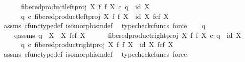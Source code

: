 \begin{isabellebody}
\ \ \ \ \ \ {\isachardoublequoteopen}fibered{\isacharunderscore}{\kern0pt}product{\isacharunderscore}{\kern0pt}left{\isacharunderscore}{\kern0pt}proj\ X\ f\ f\ X\ {\isasymcirc}\isactrlsub c\ q{}\ {\isacharequal}{\kern0pt}\ id\ X{\isachardoublequoteclose}\isanewline
\ \ \ \ \ \ {\isachardoublequoteopen}q{}\ {\isasymcirc}\isactrlsub c\ fibered{\isacharunderscore}{\kern0pt}product{\isacharunderscore}{\kern0pt}left{\isacharunderscore}{\kern0pt}proj\ X\ f\ f\ X\ {\isacharequal}{\kern0pt}\ id\ {\isacharparenleft}{\kern0pt}X\ \isactrlbsub f\isactrlesub {\isasymtimes}\isactrlsub c\isactrlbsub f\isactrlesub \ X{\isacharparenright}{\kern0pt}{\isachardoublequoteclose}\isanewline
\ \ \ \ \isamarkupfalse%
\ assms{\isacharparenleft}{\kern0pt}{}{\isacharcomma}{\kern0pt}{}{\isacharparenright}{\kern0pt}\ cfunc{\isacharunderscore}{\kern0pt}type{\isacharunderscore}{\kern0pt}def\ isomorphism{\isacharunderscore}{\kern0pt}def\ \isamarkupfalse%
\ {\isacharparenleft}{\kern0pt}typecheck{\isacharunderscore}{\kern0pt}cfuncs{\isacharcomma}{\kern0pt}\ force{\isacharparenright}{\kern0pt}\isanewline
\isanewline
\ \ \isamarkupfalse%
\ q{}\ \ \isanewline
\ \ \ \ q{}{\isacharunderscore}{\kern0pt}assms{\isacharcolon}{\kern0pt}\ {\isachardoublequoteopen}q{}\ {\isacharcolon}{\kern0pt}\ X\ {\isasymrightarrow}\ X\ \isactrlbsub f\isactrlesub {\isasymtimes}\isactrlsub c\isactrlbsub f\isactrlesub \ X{\isachardoublequoteclose}\isanewline
\ \ \ \ \ \ {\isachardoublequoteopen}fibered{\isacharunderscore}{\kern0pt}product{\isacharunderscore}{\kern0pt}right{\isacharunderscore}{\kern0pt}proj\ X\ f\ f\ X\ {\isasymcirc}\isactrlsub c\ q{}\ {\isacharequal}{\kern0pt}\ id\ X{\isachardoublequoteclose}\isanewline
\ \ \ \ \ \ {\isachardoublequoteopen}q{}\ {\isasymcirc}\isactrlsub c\ fibered{\isacharunderscore}{\kern0pt}product{\isacharunderscore}{\kern0pt}right{\isacharunderscore}{\kern0pt}proj\ X\ f\ f\ X\ {\isacharequal}{\kern0pt}\ id\ {\isacharparenleft}{\kern0pt}X\ \isactrlbsub f\isactrlesub {\isasymtimes}\isactrlsub c\isactrlbsub f\isactrlesub \ X{\isacharparenright}{\kern0pt}{\isachardoublequoteclose}\isanewline
\ \ \ \ \isamarkupfalse%
\ assms{\isacharparenleft}{\kern0pt}{}{\isacharcomma}{\kern0pt}{}{\isacharparenright}{\kern0pt}\ cfunc{\isacharunderscore}{\kern0pt}type{\isacharunderscore}{\kern0pt}def\ isomorphism{\isacharunderscore}{\kern0pt}def\ \isamarkupfalse%
\ {\isacharparenleft}{\kern0pt}typecheck{\isacharunderscore}{\kern0pt}cfuncs{\isacharcomma}{\kern0pt}\ force{\isacharparenright}{\kern0pt}\isanewline

\end{isabellebody}
